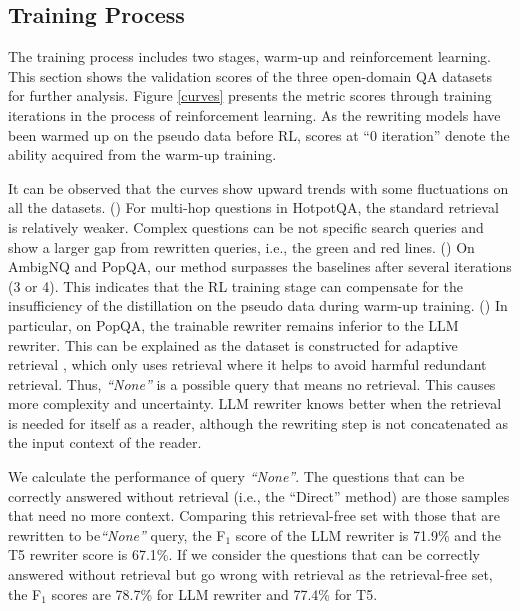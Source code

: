 \subsection{Training Process}
The training process includes two stages, warm-up and reinforcement learning.
This section shows the validation scores of the three open-domain QA datasets for further analysis.
Figure \ref{curves} presents the metric scores through training iterations in the process of reinforcement learning. 
As the rewriting models have been warmed up on the pseudo data before RL, scores at ``0 iteration'' denote the ability acquired from the warm-up training.

It can be observed that the curves show upward trends with some fluctuations on all the datasets.
() For multi-hop questions in HotpotQA, the standard retrieval is relatively weaker. 
Complex questions can be not specific search queries and show a larger gap from rewritten queries, i.e., the green and red lines.
() On AmbigNQ and PopQA, our method surpasses the baselines after several iterations (3 or 4). %
This indicates that the RL training stage can compensate for the insufficiency of the distillation on the pseudo data during warm-up training.
() In particular, on PopQA, the trainable rewriter remains inferior to the LLM rewriter. This can be explained as the dataset is constructed for adaptive retrieval \cite{mallen2023llm_memorization}, which only uses retrieval
where it helps to avoid harmful redundant retrieval. Thus, \textit{``None''} is a possible query that means no retrieval. This causes more complexity and uncertainty. LLM rewriter knows better when the retrieval is needed for itself as a reader, although the rewriting step is not concatenated as the input context of the reader.

We calculate the performance of query \textit{``None''}.
The questions that can be correctly answered without retrieval (i.e., the ``Direct'' method) are those samples that need no more context. 
Comparing this retrieval-free set with those that are rewritten to be\textit{``None''} query,
the F$_{1}$ score of the LLM rewriter is 71.9\% and the T5 rewriter score is 67.1\%.
If we consider the questions that can be correctly answered without retrieval but go wrong with retrieval as the retrieval-free set, the F$_{1}$ scores are 78.7\% for LLM rewriter and 77.4\% for T5.

